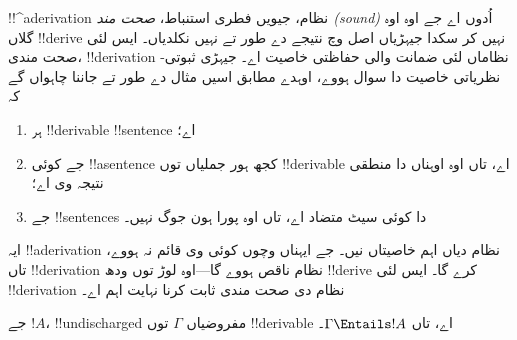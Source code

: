 \documentclass[../../../include/open-logic-section]{subfiles}
\begin{document}
      {}
      {}
      

\begin{explain}
!!^a{derivation} نظام، جیویں فطری استنباط، \emph{صحت مند (sound)}
اُدوں اے جے اوہ اوہ گلاں !!{derive} نہیں کر سکدا جیہڑیاں اصل وچ
نتیجے دے طور تے نہیں نکلدیاں۔ ایس لئی صحت مندی، !!{derivation} نظاماں
لئی ضمانت والی حفاظتی خاصیت اے۔ جیہڑی ثبوتی-نظریاتی خاصیت دا سوال ہووے،
اوہدے مطابق اسیں مثال دے طور تے جاننا چاہواں گے کہ
\begin{enumerate}
\item ہر !!{derivable} !!{sentence}  اے؛
\item جے کوئی !!a{sentence} کجھ ہور جملیاں توں !!{derivable} اے، تاں اوہ
  اوہناں دا منطقی نتیجہ وی اے؛
\item جے !!{sentence}s دا کوئی سیٹ متضاد اے، تاں اوہ پورا ہون جوگ نہیں۔
\end{enumerate}
ایہ !!a{derivation} نظام دیاں اہم خاصیتاں نیں۔ جے ایہناں وچوں کوئی وی
قائم نہ ہووے، تاں !!{derivation} نظام ناقص ہووے گا---اوہ لوڑ توں ودھ
!!{derive} کرے گا۔ ایس لئی !!{derivation} نظام دی صحت مندی ثابت کرنا
نہایت اہم اے۔
\end{explain}

\begin{thm}
جے $!A$، !!{undischarged} مفروضیاں
$\Gamma$ توں !!{derivable} اے، تاں $\Gamma \Entails !A$۔
\end{thm}
\end{document}

